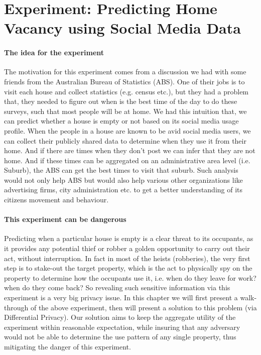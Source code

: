\documentclass[12pt]{report}
\theoremstyle{named}
\begin{document}
\section{Experiment: Predicting Home Vacancy using Social Media Data}
\paragraph{The idea for the experiment\\}
The motivation for this experiment comes from a discussion we had with some friends from the Australian Bureau of Statistics (ABS). One of their jobs is to visit each house and collect statistics (e.g. census etc.), but they had a problem that, they needed to figure out when is the best time of the day to do these surveys, such that most people will be at home. We had this intuition that, we can predict whether a house is empty or not based on its social media usage profile. When the people in a house are known to be avid social media users, we can collect their publicly shared data to determine when they use it from their home. And if there are times when they don't post we can infer that they are not home. And if these times can be aggregated on an administrative area level (i.e. Suburb), the ABS can get the best times to visit that suburb. Such analysis would not only help ABS but would also help various other organizations like advertising firms, city administration etc. to get a better understanding of its citizens movement and behaviour.
\paragraph{This experiment can be dangerous\\}
Predicting when a particular house is empty is a clear threat to its occupants, as it provides any potential thief or robber a golden opportunity to carry out their act, without interruption. In fact in most of the heists (robberies), the very first step is to stake-out the target property, which is the act to physically spy on  the property to determine how the occupants use it, i.e. when do they leave for work? when do they come back? So revealing such sensitive information via this experiment is a very big privacy issue. In this chapter we will first present a walk-through of the above experiment, then will present a solution to this problem (via Differential Privacy). Our solution aims to keep the aggregate utility of the experiment within reasonable expectation, while insuring that any adversary would not be able to determine the use pattern of any single property, thus mitigating the danger of this experiment.
\end{document}
